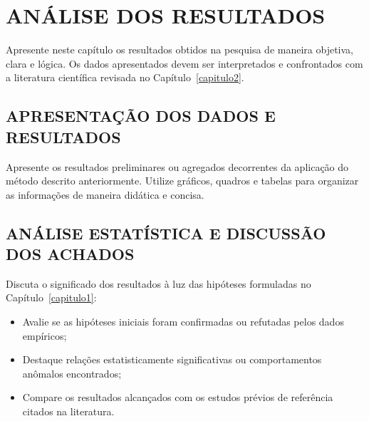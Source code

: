 \chapter{ANÁLISE DOS RESULTADOS}
\label{capitulo4}

Apresente neste capítulo os resultados obtidos na pesquisa de maneira objetiva, clara e lógica. Os dados apresentados devem ser interpretados e confrontados com a literatura científica revisada no Capítulo~\ref{capitulo2}.

\section{APRESENTAÇÃO DOS DADOS E RESULTADOS}
\label{sec:apresentacao_resultados}

Apresente os resultados preliminares ou agregados decorrentes da aplicação do método descrito anteriormente. Utilize gráficos, quadros e tabelas para organizar as informações de maneira didática e concisa.

\section{ANÁLISE ESTATÍSTICA E DISCUSSÃO DOS ACHADOS}
\label{sec:analise_discussao}

Discuta o significado dos resultados à luz das hipóteses formuladas no Capítulo~\ref{capitulo1}:
\begin{itemize}
  \item Avalie se as hipóteses iniciais foram confirmadas ou refutadas pelos dados empíricos;
  \item Destaque relações estatisticamente significativas ou comportamentos anômalos encontrados;
  \item Compare os resultados alcançados com os estudos prévios de referência citados na literatura.
\end{itemize}
